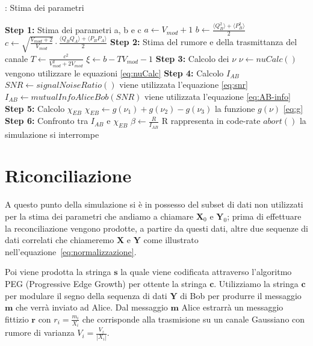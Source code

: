 \begin{algorithm}[H]
\caption{: Stima dei parametri}\label{al:stima-param}
\begin{algorithmic}[1]
\State \textbf{Step 1:} Stima dei parametri a, b e c \newline
	$a \leftarrow V_{mod} + 1$ \newline
	$b \leftarrow \frac{\langle Q_B^2 \rangle + \langle P_B^2\rangle}{2} $ \newline
	$c \leftarrow \sqrt{\frac{V_{mod} + 2}{V_{mod}}} \cdot \frac{\langle Q_BQ_A \rangle + \langle P_BP_A\rangle}{2}$ 
\State \textbf{Step 2:} Stima del rumore e della trasmittanza del canale \newline
	$T \leftarrow \frac{c^2}{V_{mod}^2 + 2 V_{mod}}$ \newline
	$\xi \leftarrow b - TV_{mod} -1 $ 
\State \textbf{Step 3:} Calcolo dei $\nu$ \newline
	$\textbf{$\nu$} \leftarrow nuCalc()$  		 \Comment vengono utilizzare le equazioni \ref{eq:nuCalc}
\State \textbf{Step 4:} Calcolo $I_{AB}$ \newline
	$SNR \leftarrow signalNoiseRatio()$	\Comment viene utilizzata l'equazione \ref{eq:snr}	
	$I_{AB} \leftarrow mutualInfoAliceBob(SNR)$	\Comment viene utilizzata l'equazione \ref{eq:AB-info}
\State \textbf{Step 5:} Calcolo $\chi_{EB}$ \newline
	$\chi_{EB} \leftarrow g(\nu_1) + g(\nu_2) - g(\nu_3)$	\Comment la funzione $g(\nu)$ \ref{eq:g}						
\State \textbf{Step 6:} Confronto tra $I_{AB}$ e $\chi_{EB}$  \newline
	$\beta \leftarrow \frac{R}{I_{AB}}$	\Comment R rappresenta in code-rate
		\State	$abort()$		\Comment la simulazione si interrompe
	\EndIf
\end{algorithmic}
\end{algorithm}


\section{Riconciliazione}
A questo punto della simulazione si \`e in possesso del subset di dati non utilizzati per la stima dei parametri che andiamo a chiamare $\textbf{X}_0$ e $\textbf{Y}_0$; prima di effettuare la reconciliazione vengono prodotte, a partire da questi dati, altre due sequenze di dati correlati che chiameremo $\textbf{X}$ e $\textbf{Y}$ come illustrato nell'equazione~\ref{eq:normalizzazione}. 

Poi viene prodotta la stringa $\textbf{s}$ la quale viene codificata attraverso l'algoritmo PEG (Progressive Edge Growth) per ottente la stringa $\textbf{c}$. Utilizziamo la stringa $\textbf{c}$ per modulare il segno della sequenza di dati $\textbf{Y}$ di Bob per produrre il messaggio  $\textbf{m}$ che verr\`a inviato ad Alice. Dal messaggio  $\textbf{m}$ Alice estrarr\`a un messaggio fittizio $\textbf{r}$ con $r_i = \frac{m_i}{X_i}$ che corrisponde alla trasmisione su un canale Gaussiano con rumore di varianza $V_i = \frac{V_z}{|X_i|}$.

